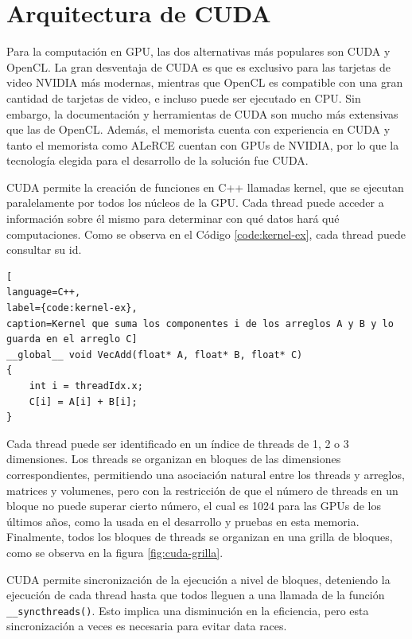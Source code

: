 \section{Arquitectura de CUDA}\label{sec:arquitectura-cuda}
Para la computación en GPU, las dos alternativas más populares son CUDA y OpenCL. La gran desventaja de CUDA es que es exclusivo para las tarjetas de video NVIDIA más modernas, mientras que OpenCL es compatible con una gran cantidad de tarjetas de video, e incluso puede ser ejecutado en CPU. Sin embargo, la documentación y herramientas de CUDA son mucho más extensivas que las de OpenCL. Además, el memorista cuenta con experiencia en CUDA y tanto el memorista como ALeRCE cuentan con GPUs de NVIDIA, por lo que la tecnología elegida para el desarrollo de la solución fue CUDA.

CUDA permite la creación de funciones en C++ llamadas kernel, que se ejecutan paralelamente por todos los núcleos de la GPU. Cada thread puede acceder a información sobre él mismo para determinar con qué datos hará qué computaciones. Como se observa en el Código \ref{code:kernel-ex}, cada thread puede consultar su id.

\begin{lstlisting}[
language=C++,
label={code:kernel-ex},
caption=Kernel que suma los componentes i de los arreglos A y B y lo guarda en el arreglo C]
__global__ void VecAdd(float* A, float* B, float* C)
{
    int i = threadIdx.x;
    C[i] = A[i] + B[i];
}
\end{lstlisting}
Cada thread puede ser identificado en un índice de threads de 1, 2 o 3 dimensiones. Los threads se organizan en bloques de las dimensiones correspondientes, permitiendo una asociación natural entre los threads y arreglos, matrices y volumenes, pero con la restricción de que el número de threads en un bloque no puede superar cierto número, el cual es 1024 para las GPUs de los últimos años, como la usada en el desarrollo y pruebas en esta memoria. Finalmente, todos los bloques de threads se organizan en una grilla de bloques, como se observa en la figura \ref{fig:cuda-grilla}.

CUDA permite sincronización de la ejecución a nivel de bloques, deteniendo la ejecución de cada thread hasta que todos lleguen a una llamada de la función \texttt{\_\_syncthreads()}. Esto implica una disminución en la eficiencia, pero esta sincronización a veces es necesaria para evitar data races.

